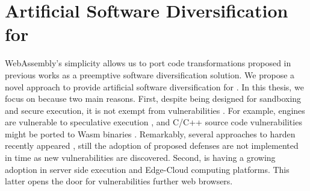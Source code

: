 \section{Artificial Software Diversification for \wasm}

WebAssembly's simplicity allows us to port code transformations proposed in previous works as a preemptive software diversification solution.
We propose a novel approach to provide artificial software diversification for \wasm.
In this thesis, we focus on \wasm because two main reasons. First,
despite being designed for sandboxing and secure execution, it is not exempt from vulnerabilities \cite{WebAssemblySecurity}.
For example, \wasm engines are vulnerable to speculative execution \cite{Narayan2021Swivel}, and C/C++ source code vulnerabilities might be ported to Wasm binaries \cite{DeRoover2022}.  
Remarkably, several approaches to harden \wasm recently appeared \cite{johnson2021}, still the adoption of proposed defenses are not implemented in time as new vulnerabilities are discovered.
Second, \wasm is having a growing adoption in server side execution and Edge-Cloud computing platforms.
This latter opens the door for vulnerabilities further web browsers.






